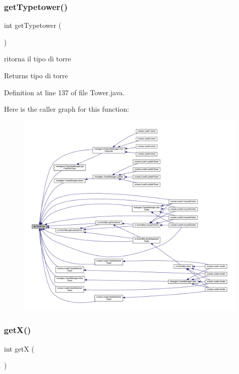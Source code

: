 \subsubsection{\texorpdfstring{get\+Typetower()}{getTypetower()}}
{\footnotesize\ttfamily int get\+Typetower (\begin{DoxyParamCaption}{ }\end{DoxyParamCaption})}



ritorna il tipo di torre 

\begin{DoxyReturn}{Returns}
tipo di torre 
\end{DoxyReturn}


Definition at line 137 of file Tower.\+java.

Here is the caller graph for this function\+:\nopagebreak
\begin{figure}[H]
\begin{center}
\leavevmode
\includegraphics[width=350pt]{classtowers_1_1_tower_adaa3345598ef202753372f185625e5da_icgraph}
\end{center}
\end{figure}
\mbox{\label{classtowers_1_1_tower_ae13f88e922e1339355456062ad9fa359}} 
\subsubsection{\texorpdfstring{get\+X()}{getX()}}
{\footnotesize\ttfamily int getX (\begin{DoxyParamCaption}{ }\end{DoxyParamCaption})}




